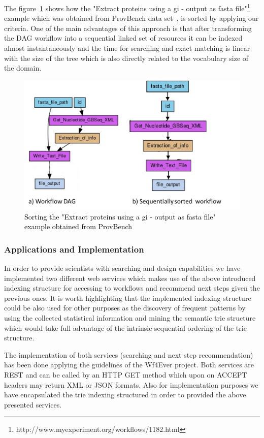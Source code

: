 The figure~\ref{fig:sorting-workflow} shows how the "Extract proteins using a gi - output as fasta file"\footnote{http://www.myexperiment.org/workflows/1182.html} example which was obtained from ProvBench data set~\cite{khalid_13}, is sorted by applying our criteria. One of the main advantages of this approach is that after transforming the DAG workflow into a sequential linked set of resources it can be indexed almost instantaneously and the time for searching and exact matching is linear with the size of the tree which is also directly related to the vocabulary size of the domain.

\begin{figure}[ht!]
\centering
\includegraphics[scale=0.70]{Figures/sorting-workflow.png}
\caption{\textcolor{black}{Sorting the "Extract proteins using a gi - output as fasta file" example obtained from ProvBench}}
\label{fig:sorting-workflow}
\end{figure}

\subsubsection{Applications and Implementation}
In order to provide scientists with searching and design capabilities we have implemented two different web services which makes use of the above introduced indexing structure for accessing to workflows and recommend next steps given the previous ones. It is worth highlighting that the implemented indexing structure could be also used for other purposes as the discovery of frequent patterns by using the collected statistical information and mining the semantic trie structure which would take full advantage of the intrinsic sequential ordering of the trie structure. 

The implementation of both services (searching and next step recommendation) has been done applying the guidelines of the Wf4Ever project. Both services are REST and can be called by an HTTP GET method which upon on ACCEPT headers may return XML or JSON formats. Also for implementation purposes we have encapsulated the trie indexing structured in order to provided the above presented services.
 
